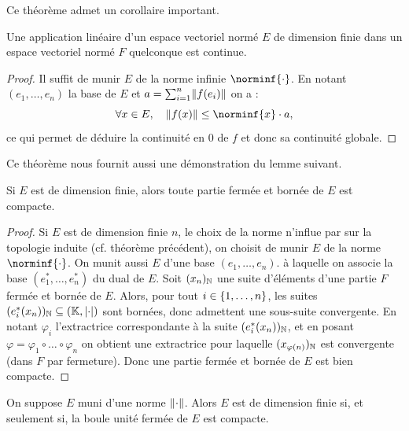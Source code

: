 Ce théorème admet un corollaire important.

\begin{coro}
Une application linéaire d'un espace vectoriel normé $E$ de dimension finie dans un espace vectoriel normé $F$ quelconque est continue.
\end{coro}

\begin{proof}
Il suffit de munir $E$ de la norme infinie $\norminf{\cdot}$. 
En notant $(e_1, \dots, e_n)$ la base de $E$ et $a= \sum_{i=1}^n \lVert f(e_i)\rVert$ on a :
\[ \forall x \in E, \quad  \norm{f(x)} \leq \norminf{x} \cdot a , \]
ce qui permet de déduire la continuité en $0$ de $f$ et donc sa continuité globale.
\end{proof}

Ce théorème nous fournit aussi une démonstration du lemme suivant.

\begin{lem}
Si $E$ est de dimension finie, alors toute partie fermée et bornée de $E$ est compacte.
\end{lem}

\begin{proof}
Si $E$ est de dimension finie $n$, le choix de la norme n'influe par sur la topologie induite (cf. théorème précédent), 
on choisit de munir $E$ de la norme $\norminf{\cdot}$.
On munit aussi $E$ d'une base $(e_1, \dots, e_n)$. à laquelle on associe la base $(e_1^{\ast}, \dots, e_n^{\ast})$ du dual de $E$.
Soit $(x_n)_{\mathbb{N}}$ une suite d'éléments d'une partie $F$ fermée et bornée de $E$.
Alors, pour tout $i \in \{ 1, \dots, n \}$, les suites $(e_i^{\ast}(x_n))_{\mathbb{N}} \subseteq (\mathbb{K}, \lvert\cdot\rvert)$ sont bornées, 
donc admettent une sous-suite convergente. 
En notant $\varphi_i$ l'extractrice correspondante à la suite $(e_i^{\ast}(x_n))_{\mathbb{N}}$, 
et en posant $\varphi = \varphi_1 \circ \dots \circ \varphi_n$ 
on obtient une extractrice pour laquelle $(x_{\varphi(n)})_{\mathbb{N}}$ est convergente (dans $F$ par fermeture). 
Donc une partie fermée et bornée de $E$ est bien compacte.
\end{proof}



\begin{thm}[de Riesz]
On suppose $E$ muni d'une norme $\lVert\cdot\rVert$. 
Alors $E$ est de dimension finie si, et seulement si, la boule unité fermée de $E$ est compacte.
\end{thm}


